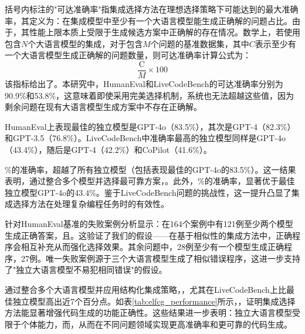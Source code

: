 \documentclass{article}
\newcommand{\tool}{EnsLLM}
\begin{document}
\begin{CJK*}{UTF8}{gbsn}
括号内标注的"可达准确率"指集成选择方法在理想选择策略下可能达到的最大准确率，其定义为：在集成模型中至少有一个大语言模型能生成正确解的问题占比。由于，其性能上限本质上受限于生成候选方案中正确解的存在情况。数学上，若使用包含\( N \)个大语言模型的集成，对于包含\( M \)个问题的基准数据集，其中\( C \)表示至少有一个大语言模型生成正确解的问题数量，则可达准确率计算公式为：
\[
\frac{\text{C}}{M} \times 100
\]
该指标给出了。本研究中，HumanEval和LiveCodeBench的可达准确率分别为90.9\%和53.8\%，这意味着即使采用完美选择机制，系统也无法超越这些值，因为剩余问题在现有大语言模型生成方案中不存在正确解。

HumanEval上表现最佳的独立模型是GPT-4o（83.5\%），其次是GPT-4（82.3\%）和GPT-3.5（76.8\%）。LiveCodeBench中准确率最高的独立模型同样是GPT-4o（43.4\%），随后是GPT-4（42.2\%）和CoPilot（41.6\%）。

\%的准确率，超越了所有独立模型（包括表现最佳的GPT-4o的83.5\%）。这一结果表明，通过整合多个模型并选择最可靠方案，。此外，\%的准确率，显著优于最佳独立模型GPT-4o的43.4\%。鉴于LiveCodeBench问题的挑战性，这一提升凸显了集成选择方法在处理复杂编程任务时的有效性。

针对HumanEval基准的失败案例分析显示：在164个案例中有121例至少两个模型生成正确答案，且。这验证了我们的假设——在基于相似性的集成方法中，正确程序会相互补充从而强化选择效果。其余问题中，28例至少有一个模型生成正确程序，27例。唯一失败案例源于三个大语言模型生成了相似错误程序，这进一步支持了"独立大语言模型不易犯相同错误"的假设。

通过整合多个大语言模型并应用结构化集成策略，，尤其在LiveCodeBench上比最佳独立模型高出近7个百分点。如表\ref{tab:elfcg_performance}所示，，证明集成选择方法能显著增强代码生成的功能正确性。这些结果进一步表明：独立大语言模型受限于个体能力，而，从而在不同问题领域实现更高准确率和更可靠的代码生成。


\end{CJK*}
\end{document}
